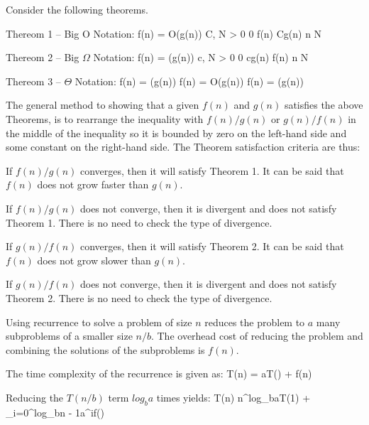 \usemodule[m-notes]
\usemodule[newmat]

\subject{Asymptotic Notation}

    Consider the following theorems.

    Thereom 1 -- Big O Notation:
    \startformula
        f(n) = O(g(n))  \exists \text{ } C, N > 0  0 \leq f(n) \leq Cg(n) \text{ } \forall \text{ } n \geq N
    \stopformula

    Thereom 2 -- Big $\Omega$ Notation:
    \startformula
        f(n) = \Omega(g(n))  \exists \text{ } c, N > 0  0 \leq cg(n) \leq f(n) \text{ } \forall \text{ } n \geq N
    \stopformula

    Thereom 3 -- $\Theta$ Notation:
    \startformula
        f(n) = \Theta(g(n)) \text{ } \iff \text{ } f(n) = O(g(n))  f(n) = \Omega(g(n))
    \stopformula

    The general method to showing that a given $f(n)$ and $g(n)$ satisfies the above Theorems, is to rearrange the inequality with $f(n)/g(n)$ or $g(n)/f(n)$ in the middle of the inequality so it is bounded by zero on the left-hand side and some constant on the right-hand side. The Theorem satisfaction criteria are thus:
    \startitemize
        \item If $f(n)/g(n)$ converges, then it will satisfy Theorem 1. It can be said that $f(n)$ does not grow faster than $g(n)$.
        \item If $f(n)/g(n)$ does not converge, then it is divergent and does not satisfy Theorem 1. There is no need to check the type of divergence.
        \item If $g(n)/f(n)$ converges, then it will satisfy Theorem 2. It can be said that $f(n)$ does not grow slower than $g(n)$.
        \item If $g(n)/f(n)$ does not converge, then it is divergent and does not satisfy Theorem 2. There is no need to check the type of divergence.
    \stopitemize

\subject{Recurrence}

    Using recurrence to solve a problem of size $n$ reduces the problem to $a$ many subproblems of a smaller size $n/b$. The overhead cost of reducing the problem and combining the solutions of the subproblems is $f(n)$.

    The time complexity of the recurrence is given as:
    \startformula T(n) = aT\left(\right) + f(n) \stopformula

    Reducing the $T(n/b)$ term $log_{b}a$ times yields:
    \startformula T(n) \approx n^{log_{b}a}T(1) + \sum_{i=0}^{\lfloor log_{b}n \rfloor - 1}a^{i}f\left(\right) \stopformula


